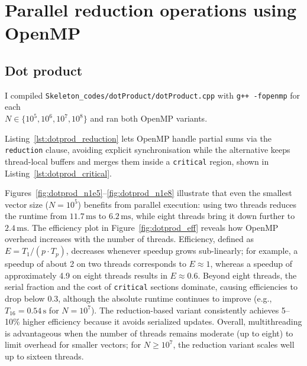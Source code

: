 \section{Parallel reduction operations using OpenMP }

\subsection*{Dot product}

I compiled \texttt{Skeleton\_codes/dotProduct/dotProduct.cpp} with \texttt{g++ -fopenmp} for each \\ $N \in \{10^5,10^6,10^7,10^8\}$ and ran both OpenMP variants.



Listing~\ref{lst:dotprod_reduction} lets OpenMP handle partial sums via the \texttt{reduction} clause, avoiding explicit synchronisation while the alternative keeps thread-local buffers and merges them inside a \texttt{critical} region, shown in Listing~\ref{lst:dotprod_critical}.



Figures~\ref{fig:dotprod_n1e5}--\ref{fig:dotprod_n1e8} illustrate that even the smallest vector size ($N = 10^5$) benefits from parallel execution: using two threads reduces the runtime from $11.7\,\mathrm{ms}$ to $6.2\,\mathrm{ms}$, while eight threads bring it down further to $2.4\,\mathrm{ms}$. The efficiency plot in Figure~\ref{fig:dotprod_eff} reveals how OpenMP overhead increases with the number of threads. Efficiency, defined as $E = T_1 /(p \cdot T_p)$, decreases whenever speedup grows sub-linearly; for example, a speedup of about 2 on two threads corresponds to $E \approx 1$, whereas a speedup of approximately 4.9 on eight threads results in $E \approx 0.6$. Beyond eight threads, the serial fraction and the cost of \texttt{critical} sections dominate, causing efficiencies to drop below 0.3, although the absolute runtime continues to improve (e.g., $T_{16} = 0.54\,\mathrm{s}$ for $N = 10^7$). The reduction-based variant consistently achieves 5–10\% higher efficiency because it avoids serialized updates. Overall, multithreading is advantageous when the number of threads remains moderate (up to eight) to limit overhead for smaller vectors; for $N \ge 10^7$, the reduction variant scales well up to sixteen threads.

